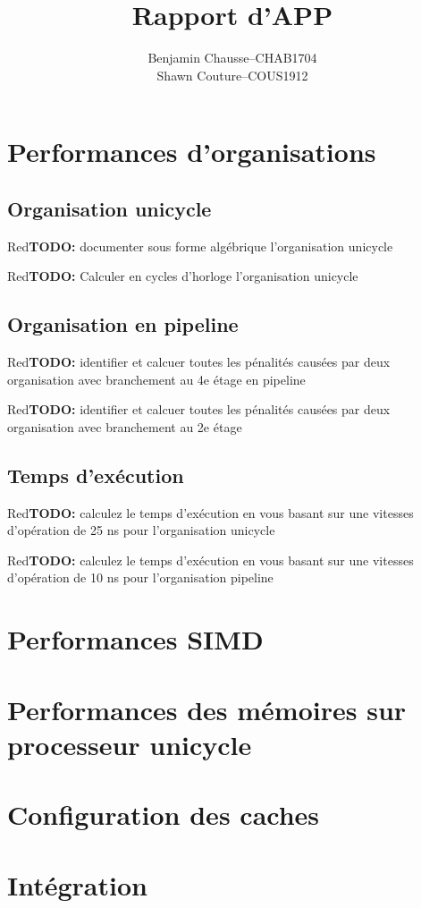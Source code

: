 \documentclass[a11paper]{article}
\title{Rapport d'APP}
\author{
  \addtolength{\tabcolsep}{-0.4em}
  \begin{tabular}{rcl} %
      Benjamin Chausse & -- & CHAB1704 \\
      Shawn Couture    & -- & COUS1912 \\
  \end{tabular}
}
\newcommand{\todo}[1]{\begin{color}{Red}\textbf{TODO:} #1\end{color}}
\begin{document}
\maketitle
\newpage
\tableofcontents
\newpage

\section{Performances d'organisations}

\subsection{Organisation unicycle}

\todo{documenter sous forme algébrique l'organisation unicycle}

\todo{Calculer en cycles d'horloge l'organisation unicycle}

\subsection{Organisation en pipeline}

\todo{identifier et calcuer toutes les pénalités causées par deux organisation
 avec branchement au 4e étage
en pipeline}

\todo{identifier et calcuer toutes les pénalités causées par deux organisation
avec branchement au 2e étage}

\subsection{Temps d'exécution}

\todo{calculez le temps d'exécution en vous basant sur une vitesses
d'opération de 25 ns pour l'organisation unicycle}

\todo{calculez le temps d'exécution en vous basant sur une vitesses
d'opération de 10 ns pour l'organisation pipeline}

\section{Performances SIMD}

\section{Performances des mémoires sur processeur unicycle}

\section{Configuration des caches}

\section{Intégration}
\end{document}
